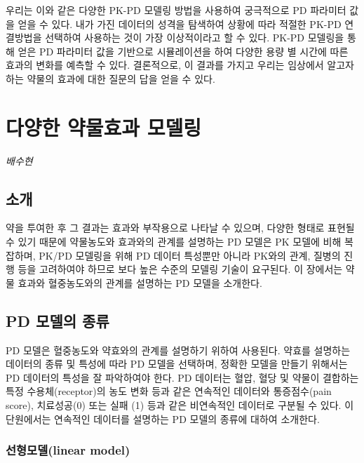 \documentclass[
  10pt,
  krantz2,
  a4paper]{krantz}
\theoremstyle{definition}
\theoremstyle{definition}
\theoremstyle{definition}
\theoremstyle{remark}
\begin{document}
우리는 이와 같은 다양한 PK-PD 모델링 방법을 사용하여 궁극적으로 PD 파라미터 값을 얻을 수 있다. 내가 가진 데이터의 성격을 탐색하여 상황에 따라 적절한 PK-PD 연결방법을 선택하여 사용하는 것이 가장 이상적이라고 할 수 있다. PK-PD 모델링을 통해 얻은 PD 파라미터 값을 기반으로 시뮬레이션을 하여 다양한 용량 별 시간에 따른 효과의 변화를 예측할 수 있다. 결론적으로, 이 결과를 가지고 우리는 임상에서 알고자 하는 약물의 효과에 대한 질문의 답을 얻을 수 있다.

\hypertarget{effect-model}{%
\chapter{다양한 약물효과 모델링}\label{effect-model}}

\emph{배수현}

\hypertarget{uxc18cuxac1c-3}{%
\section{소개}\label{uxc18cuxac1c-3}}

약을 투여한 후 그 결과는 효과와 부작용으로 나타날 수 있으며, 다양한 형태로 표현될 수 있기 때문에 약물농도와 효과와의 관계를 설명하는 PD 모델은 PK 모델에 비해 복잡하며, PK/PD 모델링을 위해 PD 데이터 특성뿐만 아니라 PK와의 관계, 질병의 진행 등을 고려하여야 하므로 보다 높은 수준의 모델링 기술이 요구된다. 이 장에서는 약물 효과와 혈중농도와의 관계를 설명하는 PD 모델을 소개한다.

\hypertarget{pd-model}{%
\section{PD 모델의 종류}\label{pd-model}}

PD 모델은 혈중농도와 약효와의 관계를 설명하기 위하여 사용된다. 약효를 설명하는 데이터의 종류 및 특성에 따라 PD 모델을 선택하며, 정확한 모델을 만들기 위해서는 PD 데이터의 특성을 잘 파악하여야 한다. PD 데이터는 혈압, 혈당 및 약물이 결합하는 특정 수용체(receptor)의 농도 변화 등과 같은 연속적인 데이터와 통증점수(pain score), 치료성공(0) 또는 실패 (1) 등과 같은 비연속적인 데이터로 구분될 수 있다. 이 단원에서는 연속적인 데이터를 설명하는 PD 모델의 종류에 대하여 소개한다.

\hypertarget{uxc120uxd615uxbaa8uxb378linear-model}{%
\subsection{선형모델(linear model)}\label{uxc120uxd615uxbaa8uxb378linear-model}}
\end{document}
